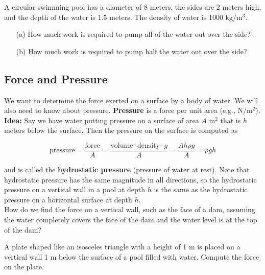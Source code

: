 \documentclass[12pt]{article}
\begin{document}
\newpage 

\Example A circular swimming pool has a diameter of 8 meters, the sides are 2 meters high, and the depth of the water is 1.5 meters. The density of water is 1000 kg/m$^3$.

\begin{itemize}
\item[(a)] How much work is required to pump all of the water out over the side?

\vfill

\item[(b)] How much work is required to pump half the water out over the side?

\vfill
\end{itemize}

\newpage

\subsection*{Force and Pressure}

We want to determine the force exerted on a surface by a body of water. We will also need to know about pressure. \textbf{Pressure} is a force per unit area (e.g., N/m$^2$).\\

\textbf{Idea:} Say we have water putting pressure on a surface of area $A$ m$^2$ that is $h$ meters below the surface. Then the pressure on the surface is computed as

$$\text{pressure}=\frac{\text{force}}{A}=\frac{\text{volume}\cdot\text{density}\cdot g}{A}=\frac{Ah\rho g}{A}=\rho gh$$

and is called the \textbf{hydrostatic pressure} (pressure of water at rest). Note that hydrostatic pressure has the same magnitude in all directions, so the hydrostatic pressure on a vertical wall in a pool at depth $h$ is the same as the hydrostatic pressure on a horizontal surface at depth $h$.\\

How do we find the force on a vertical wall, such as the face of a dam, assuming the water completely covers the face of the dam and the water level is at the top of the dam?

\newpage

\Example A plate shaped like an isosceles triangle with a height of 1 m is placed on a vertical wall 1 m below the surface of a pool filled with water. Compute the force on the plate.
\end{document}

